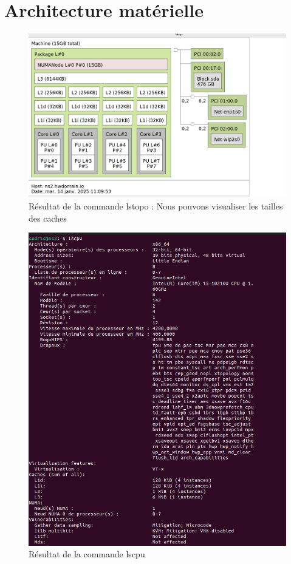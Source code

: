 \documentclass[a4paper,13pt]{book}
\author{\bsc{DADA SIMEU Cédric Darel}}
\begin{document}
	
\tableofcontents
\listoffigures
\newpage
\section{Architecture matérielle }
\begin{figure}[!h]
  \begin{center}
      \includegraphics[scale=0.3]{../images/lstopo.png}
      \caption{Résultat de la commande lstopo : Nous pouvons visualiser les tailles des caches}
      \label{tab:ls_topo}
  \end{center}
\end{figure}
\begin{figure}[!h]
  \begin{center}
  \includegraphics[scale=0.5]{../images/lscpu.png}
  \caption{Résultat de la commande lscpu}
  \label{fig:lscpu}
\end{center}
\end{figure}
\end{document}
